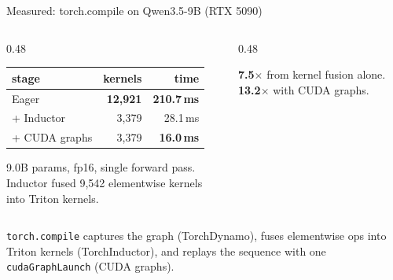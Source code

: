 \documentclass[aspectratio=169,10pt]{beamer}
\newcommand{\warnc}[1]{\textcolor{warn}{\textbf{#1}}}
\newcommand{\goodc}[1]{\textcolor{good}{\textbf{#1}}}
\begin{document}
\begin{frame}{Measured: torch.compile on Qwen3.5-9B (RTX 5090)}
  \vspace{0.2em}
  \begin{columns}[c]
    \begin{column}{0.48\textwidth}
      \centering\small
      \begin{tabular}{@{}lrr@{}}
        \toprule
        \textbf{stage} & \textbf{kernels} & \textbf{time} \\
        \midrule
        Eager & \warnc{12,921} & \warnc{210.7\,ms} \\
        + Inductor & 3,379 & 28.1\,ms \\
        + CUDA graphs & 3,379 & \goodc{16.0\,ms} \\
        \bottomrule
      \end{tabular}
      \vspace{0.6em}

      {\scriptsize 9.0B params, fp16, single forward pass.\\
       Inductor fused 9,542 elementwise kernels\\
       into Triton kernels.}
    \end{column}
    \begin{column}{0.48\textwidth}
      \centering
      \vspace{0.3em}

      \small
      \textbf{7.5$\times$} from kernel fusion alone.\\
      \textbf{13.2$\times$} with CUDA graphs.
    \end{column}
  \end{columns}
  \vspace{0.3em}
  \begin{center}\small
    \texttt{torch.compile} captures the graph (TorchDynamo), fuses
    elementwise ops into Triton kernels (TorchInductor), and replays the
    sequence with one \texttt{cudaGraphLaunch} (CUDA graphs).
  \end{center}
\end{frame}
\end{document}
